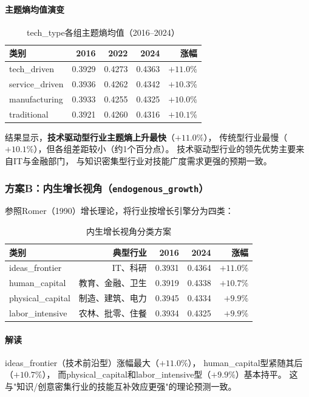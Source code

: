 \documentclass[12pt,a4paper]{ctexart}
\begin{document}
\paragraph{主题熵均值演变}

\begin{table}[h!]
\centering
\caption{tech\_type各组主题熵均值（2016--2024）}
\label{tab:tech_type_sci}
\begin{tabular}{lrrrr}
\toprule
类别 & 2016 & 2022 & 2024 & 涨幅 \\
\midrule
tech\_driven  & 0.3929 & 0.4273 & 0.4363 & $+11.0\%$ \\
service\_driven & 0.3936 & 0.4262 & 0.4342 & $+10.3\%$ \\
manufacturing & 0.3933 & 0.4255 & 0.4325 & $+10.0\%$ \\
traditional   & 0.3921 & 0.4260 & 0.4316 & $+10.1\%$ \\
\bottomrule
\end{tabular}
\end{table}

结果显示，\textbf{技术驱动型行业主题熵上升最快}（$+11.0\%$），
传统型行业最慢（$+10.1\%$），但各组差距较小（约1个百分点）。
技术驱动型行业的领先优势主要来自IT与金融部门，
与知识密集型行业对技能广度需求更强的预期一致。

\subsubsection{方案B：内生增长视角（\texttt{endogenous\_growth}）}

参照Romer（1990）增长理论，将行业按增长引擎分为四类：

\begin{table}[h!]
\centering
\caption{内生增长视角分类方案}
\label{tab:endo_growth}
\begin{tabular}{lrrrr}
\toprule
类别 & 典型行业 & 2016 & 2024 & 涨幅 \\
\midrule
ideas\_frontier  & IT、科研 & 0.3931 & 0.4364 & $+11.0\%$ \\
human\_capital   & 教育、金融、卫生 & 0.3919 & 0.4338 & $+10.7\%$ \\
physical\_capital & 制造、建筑、电力 & 0.3945 & 0.4334 & $+9.9\%$ \\
labor\_intensive  & 农林、批零、住餐 & 0.3934 & 0.4325 & $+9.9\%$ \\
\bottomrule
\end{tabular}
\end{table}

\paragraph{解读}
ideas\_frontier（技术前沿型）涨幅最大（$+11.0\%$），
human\_capital型紧随其后（$+10.7\%$），
而physical\_capital和labor\_intensive型（$+9.9\%$）基本持平。
这与"知识/创意密集行业的技能互补效应更强"的理论预测一致。
\end{document}
